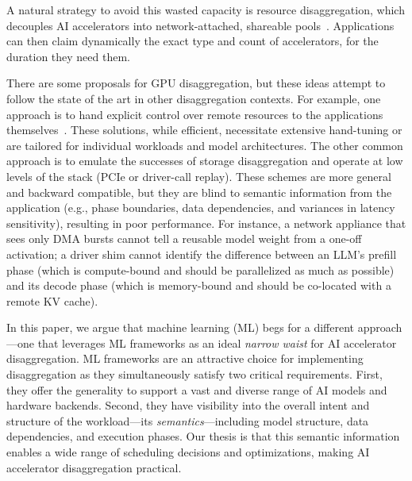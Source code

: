 A natural strategy to avoid this wasted capacity is resource disaggregation, 
which decouples AI accelerators into network-attached, shareable pools~\cite{logos,federated_coherence,lim2012system,gimbal}.
Applications can then claim dynamically
  the exact type and count of accelerators, for the duration they need them.

There are some proposals for GPU disaggregation, but these ideas 
attempt to follow the state of the art in other disaggregation contexts.
For example, one approach is to hand explicit control over remote resources to the applications themselves~\cite{distserve-2024,prism-2025}.
These solutions, while efficient, necessitate extensive hand-tuning or are
  tailored for individual workloads and model architectures.
The other common approach is to emulate the successes of storage disaggregation and operate at low levels of the stack
  (PCIe or driver-call replay).
These schemes are more general and backward compatible, but they are
blind to semantic information from the application (e.g., phase boundaries, data dependencies, and variances in latency sensitivity), resulting in 
poor performance.
For instance, a network appliance that sees only DMA bursts cannot tell a reusable model weight from a one-off activation; 
a driver shim cannot identify the difference between an LLM's prefill phase (which is compute-bound and should be parallelized as much as possible) and its decode phase (which is memory-bound and should be co-located with a remote KV cache).

In this paper, we argue that machine learning (ML) begs for a different approach---one that leverages ML frameworks as an ideal \emph{narrow waist} for AI accelerator disaggregation.
ML frameworks are an attractive choice for implementing disaggregation
  as they simultaneously satisfy two critical requirements.
First, they offer the generality to support a vast and diverse range of AI models and hardware backends.
Second, they have visibility into the overall intent and structure of the workload---its \textit{semantics}---including model structure, data dependencies, and execution phases.
Our thesis is that this semantic information enables a wide range of scheduling decisions and optimizations, making
AI accelerator disaggregation practical.

